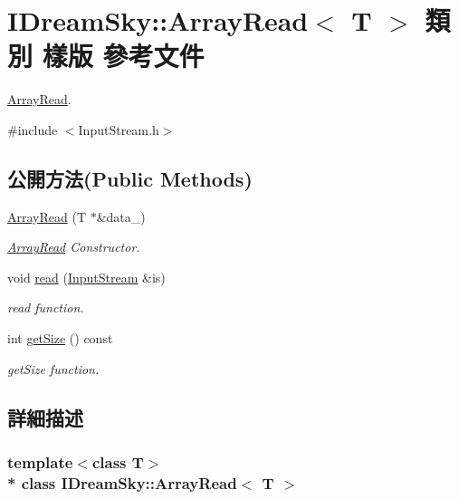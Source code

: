 \hypertarget{class_i_dream_sky_1_1_array_read}{}\section{I\+Dream\+Sky\+:\+:Array\+Read$<$ T $>$ 類別 樣版 參考文件}
\label{class_i_dream_sky_1_1_array_read}


\hyperlink{class_i_dream_sky_1_1_array_read}{Array\+Read}.  




{\ttfamily \#include $<$Input\+Stream.\+h$>$}

\subsection*{公開方法(Public Methods)}
\begin{DoxyCompactItemize}
\item 
\hyperlink{class_i_dream_sky_1_1_array_read_a76c40583ea511b0183960a2613d06a09}{Array\+Read} (T $\ast$\&data\+\_\+)
\begin{DoxyCompactList}\small\item\em \hyperlink{class_i_dream_sky_1_1_array_read}{Array\+Read} Constructor. \end{DoxyCompactList}\item 
void \hyperlink{class_i_dream_sky_1_1_array_read_a88dcb49ed6c18ed4fccaafe65a9e8aec}{read} (\hyperlink{class_i_dream_sky_1_1_input_stream}{Input\+Stream} \&is)
\begin{DoxyCompactList}\small\item\em read function. \end{DoxyCompactList}\item 
int \hyperlink{class_i_dream_sky_1_1_array_read_ac8ef9640942189d4c3696742c63e3202}{get\+Size} () const 
\begin{DoxyCompactList}\small\item\em get\+Size function. \end{DoxyCompactList}\end{DoxyCompactItemize}


\subsection{詳細描述}
\subsubsection*{template$<$class T$>$\\*
class I\+Dream\+Sky\+::\+Array\+Read$<$ T $>$}

